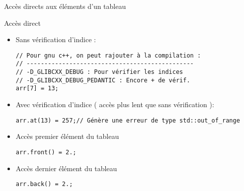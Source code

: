 \documentclass[handout,10pt]{beamer}
\begin{document}
\begin{frame}[fragile]{Accès directs aux éléments d'un tableau}
\tiny
\begin{block}{Accès direct}
\begin{itemize}
\item Sans vérification d'indice :
\begin{lstlisting}
// Pour gnu c++, on peut rajouter à la compilation :
// -----------------------------------------------
// -D_GLIBCXX_DEBUG : Pour vérifier les indices
// -D_GLIBCXX_DEBUG_PEDANTIC : Encore + de vérif.
arr[7] = 13;
\end{lstlisting}
\item Avec vérification d'indice ( accès plus lent que sans vérification ):
\begin{lstlisting}
arr.at(13) = 257;// Génère une erreur de type std::out_of_range
\end{lstlisting}
\item Accès premier élément du tableau
\begin{lstlisting}
arr.front() = 2.;
\end{lstlisting}
\item Accès dernier élément du tableau
\begin{lstlisting}
arr.back() = 2.;
\end{lstlisting}
\end{itemize}
\end{block}

\end{frame}
\end{document}
